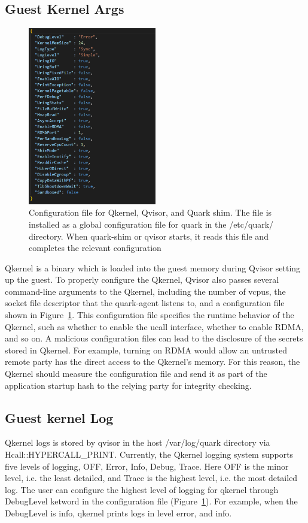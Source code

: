 \subsection{Guest Kernel Args}
\begin{figure}[H]
  \centering
  \includegraphics[width=0.5\textwidth,height=0.4\textheight]{images/quark_config.PNG}
  \caption[Configuration file for Qkernel, Qvisor, and Quark shim]{Configuration file for Qkernel, Qvisor, and Quark shim. The file is installed as a global configuration file for quark in the /etc/quark/ directory. When quark-shim or qvisor starts, it reads this file and completes the relevant configuration}
  \label{fig:quark_config}
\end{figure}

Qkernel is a binary which is loaded into the guest memory during Qvisor setting up the guest. To properly configure the Qkernel,  Qvisor also passes several command-line arguments to the Qkernel, including the number of vcpus, the socket file 
descriptor that the quark-agent listens to, and a configuration file shown in Figure~\ref{fig:quark_config}. This configuration file specifies the runtime behavior of the Qkernel, such as whether to enable the ucall interface, whether to enable RDMA, and so on. A malicious configuration 
files can lead to the disclosure of the secrets stored in Qkernel. For example, turning on RDMA would allow an untrusted remote party has the direct access to the Qkernel’s memory. For this reason, the Qkernel should measure the configuration file 
and send it as part of the application startup hash to the relying party for integrity checking. 

\subsection{Guest kernel Log}
Qkernel logs is stored by qvisor in the host /var/log/quark directory via Hcall::HYPERCALL\_PRINT. Currently, the Qkernel logging system supports five levels of logging, OFF, Error, Info, Debug, Trace. Here OFF is the minor level, i.e. the least 
detailed, and Trace is the highest level, i.e. the most detailed log. The user can configure the highest level of logging for qkernel through DebugLevel ketword in the configuration file (Figure~\ref{fig:quark_config}). For example, when the DebugLevel is info, qkernel 
prints logs in level error, and info. 

